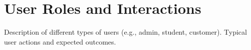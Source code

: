\section{User Roles and Interactions}
Description of different types of users (e.g., admin,
student, customer). Typical user actions and expected outcomes.